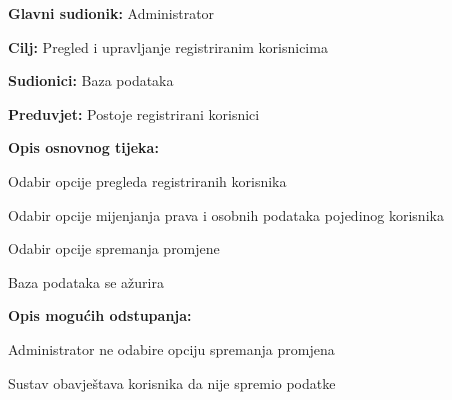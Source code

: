 					\noindent {}
					\begin{packed_item}
						
						\item \textbf{Glavni sudionik: }Administrator
						\item  \textbf{Cilj:} Pregled i upravljanje registriranim korisnicima
						\item  \textbf{Sudionici:} Baza podataka
						\item  \textbf{Preduvjet:} Postoje registrirani korisnici
						\item  \textbf{Opis osnovnog tijeka:}
						
						\item[] \begin{packed_enum}
							
							\item Odabir opcije pregleda registriranih korisnika
							\item Odabir opcije mijenjanja prava i osobnih podataka pojedinog korisnika
							\item Odabir opcije spremanja promjene
							\item Baza podataka se ažurira
							
						\end{packed_enum}
						
						\item  \textbf{Opis mogućih odstupanja:}
						
						\item[] \begin{packed_item}
							
							\item[3.a] Administrator ne odabire opciju spremanja promjena
							\item[] \begin{packed_enum}
								
								\item Sustav obavještava korisnika da nije spremio podatke 
								
							\end{packed_enum}
							
						\end{packed_item}
						
					\end{packed_item}
					
